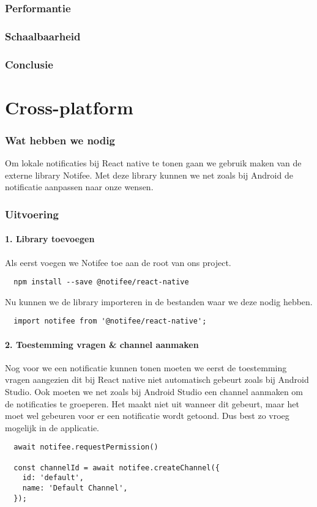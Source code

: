 \subsubsection{Performantie}

\subsubsection{Schaalbaarheid}

\subsubsection{Conclusie}


\section{Cross-platform}
\subsubsection{Wat hebben we nodig}
Om lokale notificaties bij React native te tonen gaan we gebruik maken van de externe library Notifee.
Met deze library kunnen we net zoals bij Android de notificatie aanpassen naar onze wensen.

\subsubsection{Uitvoering}
\paragraph{1. Library toevoegen}
Als eerst voegen we Notifee toe aan de root van ons project.
\begin{verbatim}
  npm install --save @notifee/react-native
\end{verbatim}
Nu kunnen we de library importeren in de bestanden waar we deze nodig hebben.
\begin{verbatim}
  import notifee from '@notifee/react-native';
\end{verbatim}

\paragraph{2. Toestemming vragen \& channel aanmaken}
Nog voor we een notificatie kunnen tonen moeten we eerst de toestemming vragen aangezien dit bij React native 
niet automatisch gebeurt zoals bij Android Studio. Ook moeten we net zoals bij Android Studio 
een channel aanmaken om de notificaties te groeperen. Het maakt niet uit wanneer dit gebeurt, maar 
het moet wel gebeuren voor er een notificatie wordt getoond. Dus best zo vroeg mogelijk in de applicatie.
\begin{verbatim}
  await notifee.requestPermission()

  const channelId = await notifee.createChannel({
    id: 'default',
    name: 'Default Channel',
  });
\end{verbatim}

